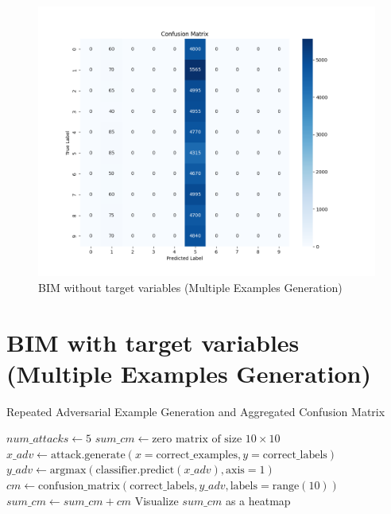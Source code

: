\documentclass[11pt,onside]{article}
\begin{document}
\begin{figure}[h]
\centering
\includegraphics[width=1\textwidth]{V1_images/mul_BIM_without_target.png}
\caption{BIM without target variables (Multiple Examples Generation)}
\label{fig: BIM without target variables (Multiple Examples Generation)}
\end{figure}

\section{BIM with target variables (Multiple Examples Generation)}

\begin{algorithm}[H]
\caption{Repeated Adversarial Example Generation and Aggregated Confusion Matrix}
\begin{algorithmic}[1]
\State $num\_attacks \gets 5$
\State $sum\_cm \gets \text{zero matrix of size } 10 \times 10$
    \State $x\_adv \gets \text{attack.generate}(x=\text{correct\_examples},y=\text{correct\_labels})$
    \State $y\_adv \gets \text{argmax}(\text{classifier.predict}(x\_adv), \text{axis}=1)$
    \State $cm \gets \text{confusion\_matrix}(\text{correct\_labels}, y\_adv, \text{labels}=\text{range}(10))$
    \State $sum\_cm \gets sum\_cm + cm$
\EndFor
\State Visualize $sum\_cm$ as a heatmap
\end{algorithmic}
\end{algorithm}
\end{document}
